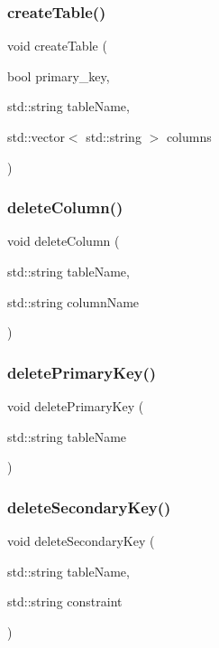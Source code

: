 \mbox{\label{tables_8hpp_a018659fc814b4a097c4b4862f42fe554}} 
\subsubsection{create\+Table()}
{\footnotesize\ttfamily void create\+Table (\begin{DoxyParamCaption}\item[{bool}]{primary\+\_\+key,  }\item[{std\+::string}]{table\+Name,  }\item[{std\+::vector$<$ std\+::string $>$}]{columns }\end{DoxyParamCaption})}

\mbox{\label{tables_8hpp_aa3b10ab46a5fb3caa76745e084685e76}} 
\subsubsection{delete\+Column()}
{\footnotesize\ttfamily void delete\+Column (\begin{DoxyParamCaption}\item[{std\+::string}]{table\+Name,  }\item[{std\+::string}]{column\+Name }\end{DoxyParamCaption})}

\mbox{\label{tables_8hpp_a36d0f9bb1b86a8155d7551fcd014b4da}} 
\subsubsection{delete\+Primary\+Key()}
{\footnotesize\ttfamily void delete\+Primary\+Key (\begin{DoxyParamCaption}\item[{std\+::string}]{table\+Name }\end{DoxyParamCaption})}

\mbox{\label{tables_8hpp_aee892818f06208ce4b68fb7598a7494c}} 
\subsubsection{delete\+Secondary\+Key()}
{\footnotesize\ttfamily void delete\+Secondary\+Key (\begin{DoxyParamCaption}\item[{std\+::string}]{table\+Name,  }\item[{std\+::string}]{constraint }\end{DoxyParamCaption})}

